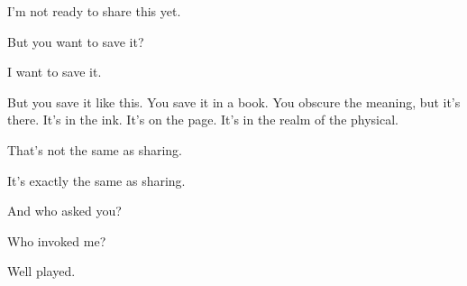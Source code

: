 \null

\vfill

I'm not ready to share this yet.

\begin{ally}
But you want to save it?
\end{ally}
I want to save it.

\begin{ally}
But you save it like this. You save it in a book. You obscure the meaning, but it's there. It's in the ink. It's on the page. It's in the realm of the physical.
\end{ally}
That's not the same as sharing.

\begin{ally}
It's exactly the same as sharing.
\end{ally}
And who asked you?

\begin{ally}
Who invoked me?
\end{ally}
Well played.

\vfill

\newpage
